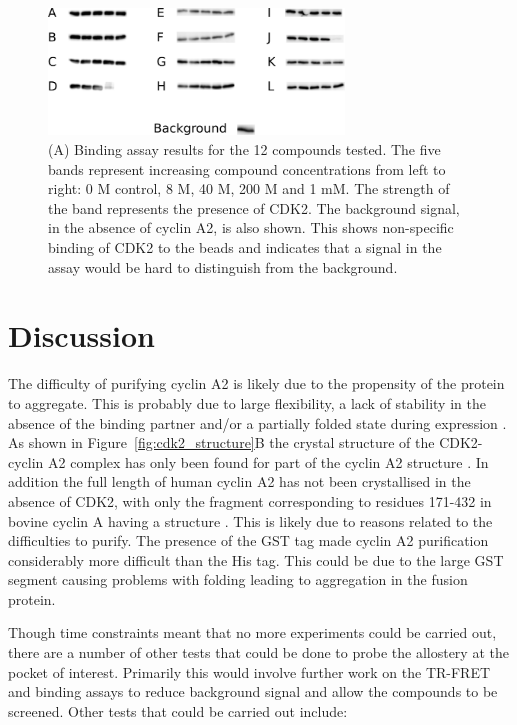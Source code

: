 \begin{figure}
\centering

\includegraphics[width=0.7\textwidth]{figures/binding_assay/binding_assay}

\caption[Results of binding assay with selected compounds]
{(A) Binding assay results for the 12 compounds tested.
The five bands represent increasing compound concentrations from left to right: 0 M control, 8 \textmu M, 40 \textmu M, 200 \textmu M and 1 mM.
The strength of the band represents the presence of CDK2.
The background signal, in the absence of cyclin A2, is also shown.
This shows non-specific binding of CDK2 to the beads and indicates that a signal in the assay would be hard to distinguish from the background.}

\label{fig:binding_assay}
\end{figure}


\section{Discussion}
\label{sec:cdk2_discussion}

The difficulty of purifying cyclin A2 is likely due to the propensity of the protein to aggregate.
This is probably due to large flexibility, a lack of stability in the absence of the binding partner and/or a partially folded state during expression \cite{Grigoroudis2015}.
As shown in Figure~\ref{fig:cdk2_structure}B the crystal structure of the CDK2-cyclin A2 complex has only been found for part of the cyclin A2 structure \cite{Jeffrey1995}.
In addition the full length of human cyclin A2 has not been crystallised in the absence of CDK2, with only the fragment corresponding to residues 171-432 in bovine cyclin A having a structure \cite{Brown1995}.
This is likely due to reasons related to the difficulties to purify.
The presence of the GST tag made cyclin A2 purification considerably more difficult than the His tag.
This could be due to the large GST segment causing problems with folding leading to aggregation in the fusion protein.

Though time constraints meant that no more experiments could be carried out, there are a number of other tests that could be done to probe the allostery at the pocket of interest.
Primarily this would involve further work on the TR-FRET and binding assays to reduce background signal and allow the compounds to be screened.
Other tests that could be carried out include:

